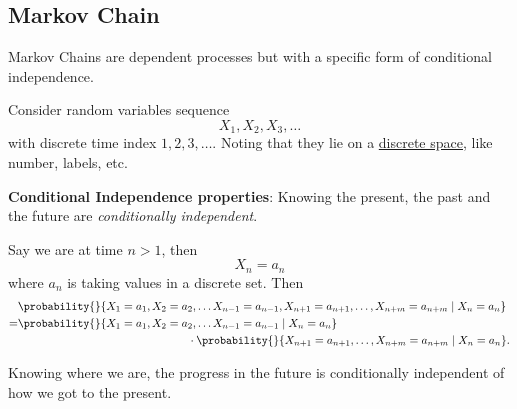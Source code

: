 \subsection{Markov Chain}
Markov Chains are dependent processes but with a specific form of conditional independence.

Consider random variables sequence
\[
	X_1, X_2, X_3, \ldots
\]
with discrete time index \(1, 2, 3, \ldots \). Noting that they lie on a \underline{discrete space}, like number, labels, etc.

\begin{note}
	\textbf{Conditional Independence properties}: Knowing the present, the past and the future are \emph{conditionally independent}.
\end{note}

Say we are at time \(n>1\), then
\[
	X_n = a_n
\]
where \(a_n\) is taking values in a discrete set. Then
	{\small
		\[
			\begin{split}
				&\probability{}{X_1 = a_1, X_2 = a_2,  \ldots X_{n-1} = a_{n-1}, X_{n+1} = a_{n+1},\ldots , X_{n+m} = a_{n+m}  \mid X_n = a_n }\\
				=&\probability{}{X_1 = a_1, X_2 = a_2,  \ldots X_{n-1} = a_{n-1}\mid X_n = a_n }\\
				&\qquad\qquad\qquad\qquad\qquad\qquad\qquad\quad\cdot \probability{}{X_{n+1} = a_{n+1},\ldots , X_{n+m} = a_{n+m}  \mid X_n = a_n}.
			\end{split}
		\]
	}

\begin{intuition}
	Knowing where we are, the progress in the future is conditionally independent of how we got to the present.
\end{intuition}

